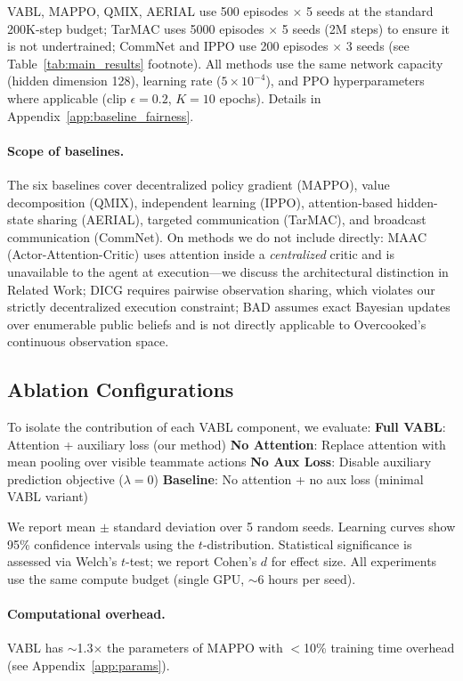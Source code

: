 \documentclass{article}
\theoremstyle{plain}
\theoremstyle{definition}
\theoremstyle{remark}
\begin{document}
VABL, MAPPO, QMIX, AERIAL use 500 episodes $\times$ 5 seeds at the standard 200K-step budget; TarMAC uses 5000 episodes $\times$ 5 seeds (2M steps) to ensure it is not undertrained; CommNet and IPPO use 200 episodes $\times$ 3 seeds (see Table~\ref{tab:main_results} footnote). All methods use the same network capacity (hidden dimension 128), learning rate ($5 \times 10^{-4}$), and PPO hyperparameters where applicable (clip $\epsilon = 0.2$, $K = 10$ epochs). Details in Appendix~\ref{app:baseline_fairness}.

\paragraph{Scope of baselines.}
The six baselines cover decentralized policy gradient (MAPPO), value decomposition (QMIX), independent learning (IPPO), attention-based hidden-state sharing (AERIAL), targeted communication (TarMAC), and broadcast communication (CommNet). On methods we do not include directly: MAAC (Actor-Attention-Critic) \cite{iqbal2019actor} uses attention inside a \emph{centralized} critic and is unavailable to the agent at execution---we discuss the architectural distinction in Related Work; DICG \cite{li2020deep} requires pairwise observation sharing, which violates our strictly decentralized execution constraint; BAD \cite{foerster2019bad} assumes exact Bayesian updates over enumerable public beliefs and is not directly applicable to Overcooked's continuous observation space.

\subsection{Ablation Configurations}
To isolate the contribution of each VABL component, we evaluate:
\textbf{Full VABL}: Attention + auxiliary loss (our method)
\textbf{No Attention}: Replace attention with mean pooling over visible teammate actions
\textbf{No Aux Loss}: Disable auxiliary prediction objective ($\lambda = 0$)
\textbf{Baseline}: No attention + no aux loss (minimal VABL variant)

We report mean $\pm$ standard deviation over 5 random seeds. Learning curves show 95\% confidence intervals using the $t$-distribution. Statistical significance is assessed via Welch's $t$-test; we report Cohen's $d$ for effect size. All experiments use the same compute budget (single GPU, $\sim$6 hours per seed).

\paragraph{Computational overhead.}
VABL has $\sim$1.3$\times$ the parameters of MAPPO with $<$10\% training time overhead (see Appendix~\ref{app:params}).
\end{document}
